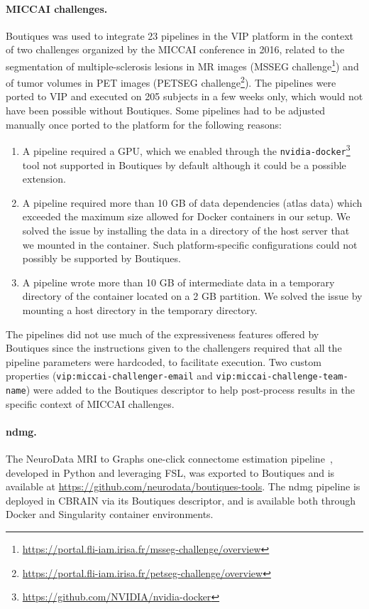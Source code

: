\documentclass{article}
\newcommand{\boutiques}{Boutiques\xspace}
\begin{document}
\paragraph{MICCAI challenges.}
\boutiques was used to integrate 23 pipelines in the VIP platform in
the context of two challenges organized by the MICCAI conference in
2016, related to the segmentation of multiple-sclerosis lesions in MR
images (MSSEG
challenge\footnote{\url{https://portal.fli-iam.irisa.fr/msseg-challenge/overview}})
and of tumor volumes in PET images (PETSEG
challenge\footnote{\url{https://portal.fli-iam.irisa.fr/petseg-challenge/overview}}). The
pipelines were ported to VIP and executed on 205 subjects in a few
weeks only, which would not have been possible without
\boutiques. Some pipelines had to be adjusted manually once ported to
the platform for the following reasons:
\begin{enumerate}
\item A pipeline
  required a GPU, which we enabled through the
  \texttt{nvidia-docker}\footnote{\url{https://github.com/NVIDIA/nvidia-docker}}
  tool not supported in Boutiques by default although it could be a possible extension.
\item A pipeline required more than 10 GB of data dependencies (atlas
  data) which exceeded the maximum size allowed for Docker containers
  in our setup. We solved the issue by installing the data in a
  directory of the host server that we mounted in the container. Such
  platform-specific configurations could not possibly be supported by
  \boutiques.
\item A pipeline wrote more than 10 GB of intermediate data in a
  temporary directory of the container located on a 2 GB partition. We
  solved the issue by mounting a host directory in the temporary directory.
\end{enumerate}
The pipelines did not use much of the expressiveness features offered
by \boutiques since the instructions given to the challengers required
that all the pipeline parameters were hardcoded, to facilitate
execution. Two custom properties (\texttt{vip:miccai-challenger-email}
and \texttt{vip:miccai-challenge-team-name}) were added to the
\boutiques descriptor to help post-process results in the specific
context of MICCAI challenges.

\paragraph{ndmg.} The NeuroData MRI to Graphs one-click connectome estimation
pipeline~\cite{kiar2017comprehensive}, developed in Python and leveraging FSL, was
exported to \boutiques and is available at \url{https://github.com/neurodata/boutiques-tools}.
The ndmg pipeline is deployed in CBRAIN via its \boutiques descriptor, and is available
both through Docker and Singularity container environments.
\end{document}
